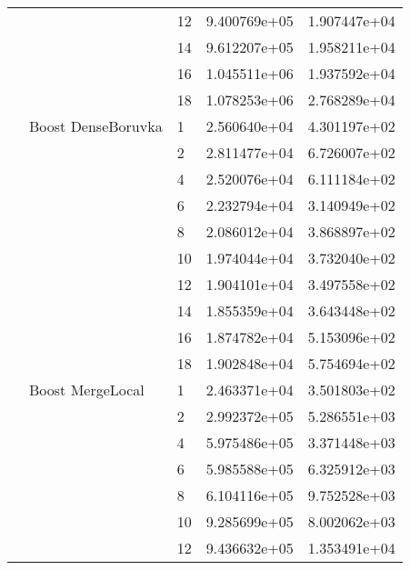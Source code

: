 \begin{tabular}{lllrr}
                      &                     & 12 &  9.400769e+05 &  1.907447e+04 \\
                      &                     & 14 &  9.612207e+05 &  1.958211e+04 \\
                      &                     & 16 &  1.045511e+06 &  1.937592e+04 \\
                      &                     & 18 &  1.078253e+06 &  2.768289e+04 \\
                      & Boost DenseBoruvka & 1  &  2.560640e+04 &  4.301197e+02 \\
                      &                     & 2  &  2.811477e+04 &  6.726007e+02 \\
                      &                     & 4  &  2.520076e+04 &  6.111184e+02 \\
                      &                     & 6  &  2.232794e+04 &  3.140949e+02 \\
                      &                     & 8  &  2.086012e+04 &  3.868897e+02 \\
                      &                     & 10 &  1.974044e+04 &  3.732040e+02 \\
                      &                     & 12 &  1.904101e+04 &  3.497558e+02 \\
                      &                     & 14 &  1.855359e+04 &  3.643448e+02 \\
                      &                     & 16 &  1.874782e+04 &  5.153096e+02 \\
                      &                     & 18 &  1.902848e+04 &  5.754694e+02 \\
                      & Boost MergeLocal & 1  &  2.463371e+04 &  3.501803e+02 \\
                      &                     & 2  &  2.992372e+05 &  5.286551e+03 \\
                      &                     & 4  &  5.975486e+05 &  3.371448e+03 \\
                      &                     & 6  &  5.985588e+05 &  6.325912e+03 \\
                      &                     & 8  &  6.104116e+05 &  9.752528e+03 \\
                      &                     & 10 &  9.285699e+05 &  8.002062e+03 \\
                      &                     & 12 &  9.436632e+05 &  1.353491e+04 \\

\end{tabular}
